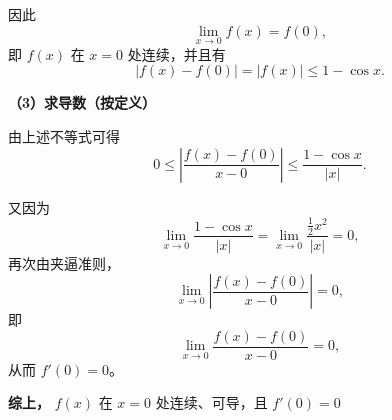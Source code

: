 \documentclass[../book.tex]{subfiles}
\begin{document}
\begin{enumerate}
\begin{analysisbox}[经典]
            因此
            \[
                \lim_{x\to 0}f(x) = f(0),
            \]
            即 $f(x)$ 在 $x=0$ 处连续，并且有
            \[
                |f(x)-f(0)| = |f(x)| \le 1-\cos x.
            \]

            \medskip
            \textcolor{analysisTitleColor}{\textbf{（3）求导数（按定义）}}

            由上述不等式可得
            \[
                0 \le
                \left|
                \frac{f(x)-f(0)}{x-0}
                \right|
                \le
                \frac{1-\cos x}{|x|}.
            \]

            又因为
            \[
                \lim_{x\to 0}\frac{1-\cos x}{|x|}
                =
                \lim_{x\to 0}\frac{\frac{1}{2}x^2}{|x|}
                =0,
            \]
            再次由夹逼准则，
            \[
                \lim_{x\to 0}
                \left|
                \frac{f(x)-f(0)}{x-0}
                \right|
                =0,
            \]
            即
            \[
                \lim_{x\to 0}
                \frac{f(x)-f(0)}{x-0}
                =0,
            \]
            从而 $f'(0)=0$。

            \medskip
            \textbf{综上，}
            $f(x)$ 在 $x=0$ 处连续、可导，且 $f'(0)=0$

        \end{analysisbox}
    \end{enumerate}
\end{document}
